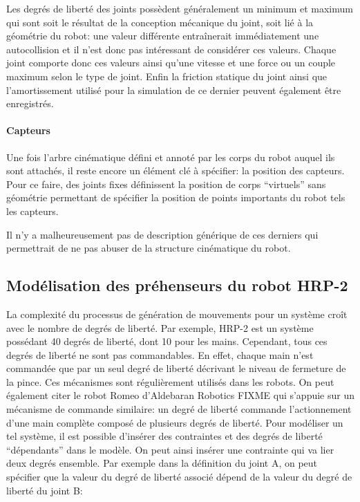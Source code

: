 Les degrés de liberté des joints possèdent généralement un minimum et
maximum qui sont soit le résultat de la conception mécanique du joint,
soit lié à la géométrie du robot: une valeur différente entraînerait
immédiatement une autocollision et il n'est donc pas intéressant de
considérer ces valeurs. Chaque joint comporte donc ces valeurs ainsi
qu'une vitesse et une force ou un couple maximum selon le type de
joint. Enfin la friction statique du joint ainsi que l'amortissement
utilisé pour la simulation de ce dernier peuvent également être
enregistrés.


\paragraph{Capteurs}

Une fois l'arbre cinématique défini et annoté par les corps du robot
auquel ils sont attachés, il reste encore un élément clé à spécifier:
la position des capteurs. Pour ce faire, des joints fixes définissent
la position de corps ``virtuels'' sans géométrie permettant de
spécifier la position de points importants du robot tels les capteurs.

Il n'y a malheureusement pas de description générique de ces derniers
qui permettrait de ne pas abuser de la structure cinématique du robot.


\subsection{Modélisation des préhenseurs du robot HRP-2}

La complexité du processus de génération de mouvements pour un système
croît avec le nombre de degrés de liberté. Par exemple, HRP-2 est un
système possédant 40 degrés de liberté, dont 10 pour les
mains. Cependant, tous ces degrés de liberté ne sont pas
commandables. En effet, chaque main n'est commandée que par un seul
degré de liberté décrivant le niveau de fermeture de la pince. Ces
mécanismes sont régulièrement utilisés dans les robots. On peut
également citer le robot Romeo d'Aldebaran Robotics FIXME qui s'appuie
sur un mécanisme de commande similaire: un degré de liberté commande
l'actionnement d'une main complète composé de plusieurs degrés de
liberté. Pour modéliser un tel système, il est possible d'insérer des
contraintes et des degrés de liberté ``dépendants'' dans le modèle. On
peut ainsi insérer une contrainte qui va lier deux degrés
ensemble. Par exemple dans la définition du joint A, on peut spécifier
que la valeur du degré de liberté associé dépend de la valeur du degré
de liberté du joint B:

